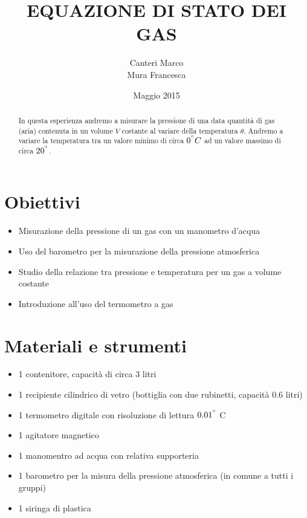 \documentclass[12pt,titlepage]{article}
\title{\textbf{EQUAZIONE DI STATO DEI GAS} }
\author{Canteri Marco\\Mura Francesca}
\date{Maggio 2015}
\begin{document}
	\maketitle
	\tableofcontents
	\renewcommand{\abstractname}{Abstract}
	
	\begin{abstract}
In questa esperienza andremo a misurare la pressione di una data quantità di gas (aria) contenuta in un volume $V$ costante al variare della temperatura $\theta$.
Andremo a variare la temperatura tra un valore minimo di circa $0^{\degree}C$ ad un valore massimo di circa $20^{\degree}$.
	\end{abstract}
	
\newpage
\section{Obiettivi}
\begin{itemize}
\item Misurazione della pressione di un gas con un manometro d'acqua
\item Uso del barometro per la misurazione della pressione atmosferica
\item Studio della relazione tra pressione e temperatura per un gas a volume costante
\item Introduzione all'uso del termometro a gas
\end{itemize}

\section{Materiali e strumenti}
\begin{itemize}
\item 1 contenitore, capacità di circa 3 litri
\item 1 recipiente cilindrico di vetro (bottiglia con due rubinetti, capacità 0.6 litri)
\item 1 termometro digitale con risoluzione di lettura $0.01^{\degree}$ C
\item 1 agitatore magnetico
\item 1 manomentro ad acqua con relativa supporteria
\item 1 barometro per la misura della pressione atmosferica (in comune a tutti i gruppi)
\item 1 siringa di plastica
\end{itemize}

\newpage

\newpage

\newpage

\end{document}
